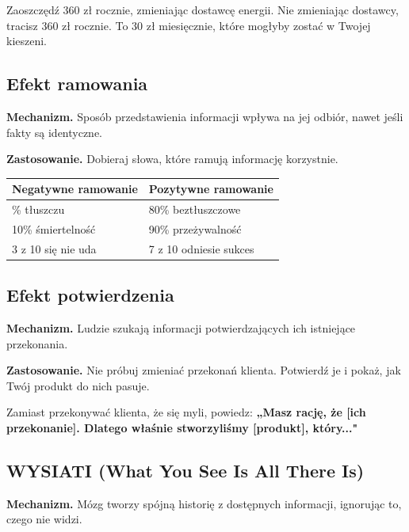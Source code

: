\documentclass[
  12pt,
  a4paper,
  twoside,
  openright,
  12pt,
  DIV=12,
  BCOR=12mm]{scrbook}
\begin{document}
\begin{beforeafter}
{Zaoszczędź 360 zł rocznie, zmieniając dostawcę energii.}
{Nie zmieniając dostawcy, tracisz 360 zł rocznie. To 30 zł miesięcznie, które mogłyby zostać w Twojej kieszeni.}
\end{beforeafter}

\subsection{Efekt ramowania}\label{efekt-ramowania}

\textbf{Mechanizm.} Sposób przedstawienia informacji wpływa na jej
odbiór, nawet jeśli fakty są identyczne.

\textbf{Zastosowanie.} Dobieraj słowa, które ramują informację
korzystnie.

\begin{longtable}[]{@{}ll@{}}
\toprule\noalign{}
Negatywne ramowanie & Pozytywne ramowanie \\
\midrule\noalign{}
\endhead
\bottomrule\noalign{}
\endlastfoot
20\% tłuszczu & 80\% beztłuszczowe \\
10\% śmiertelność & 90\% przeżywalność \\
3 z 10 się nie uda & 7 z 10 odniesie sukces \\
\end{longtable}

\subsection{Efekt potwierdzenia}\label{efekt-potwierdzenia}

\textbf{Mechanizm.} Ludzie szukają informacji potwierdzających ich
istniejące przekonania.

\textbf{Zastosowanie.} Nie próbuj zmieniać przekonań klienta. Potwierdź
je i pokaż, jak Twój produkt do nich pasuje.

\begin{wskazowka}
Zamiast przekonywać klienta, że się myli, powiedz: \textbf{„Masz rację, że [ich przekonanie]. Dlatego właśnie stworzyliśmy [produkt], który..."}
\end{wskazowka}

\subsection{WYSIATI (What You See Is All There
Is)}\label{wysiati-what-you-see-is-all-there-is}

\textbf{Mechanizm.} Mózg tworzy spójną historię z dostępnych informacji,
ignorując to, czego nie widzi.
\end{document}
